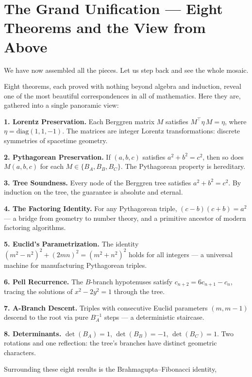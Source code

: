 \section{The Grand Unification --- Eight Theorems and the View from Above}\label{ch5-the-grand-unification-eight-theorems-and-the-view-from-above}

We have now assembled all the pieces. Let us step back and see the whole mosaic.

Eight theorems, each proved with nothing beyond algebra and induction, reveal one of the most beautiful correspondences in all of mathematics. Here they are, gathered into a single panoramic view:

\textbf{1. Lorentz Preservation.} Each Berggren matrix \(M\) satisfies \(M^\top \eta\, M = \eta\), where \(\eta = \mathrm{diag}(1, 1, -1)\). The matrices are integer Lorentz transformations: discrete symmetries of spacetime geometry.

\textbf{2. Pythagorean Preservation.} If \((a, b, c)\) satisfies \(a^2 + b^2 = c^2\), then so does \(M(a, b, c)\) for each \(M \in \{B_A, B_B, B_C\}\). The Pythagorean property is hereditary.

\textbf{3. Tree Soundness.} Every node of the Berggren tree satisfies \(a^2 + b^2 = c^2\). By induction on the tree, the guarantee is absolute and eternal.

\textbf{4. The Factoring Identity.} For any Pythagorean triple, \((c - b)(c + b) = a^2\) --- a bridge from geometry to number theory, and a primitive ancestor of modern factoring algorithms.

\textbf{5. Euclid's Parametrization.} The identity \((m^2 - n^2)^2 + (2mn)^2 = (m^2 + n^2)^2\) holds for all integers --- a universal machine for manufacturing Pythagorean triples.

\textbf{6. Pell Recurrence.} The \(B\)-branch hypotenuses satisfy \(c_{n+2} = 6c_{n+1} - c_n\), tracing the solutions of \(x^2 - 2y^2 = 1\) through the tree.

\textbf{7. A-Branch Descent.} Triples with consecutive Euclid parameters \((m, m-1)\) descend to the root via pure \(B_A^{-1}\) steps --- a deterministic staircase.

\textbf{8. Determinants.} \(\det(B_A) = 1\), \(\det(B_B) = -1\), \(\det(B_C) = 1\). Two rotations and one reflection: the tree's branches have distinct geometric characters.

Surrounding these eight results is the Brahmagupta--Fibonacci identity,

